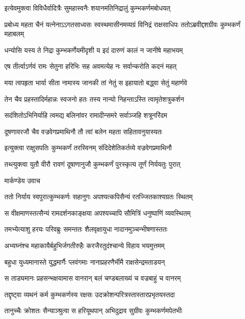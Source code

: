 \twolineshloka
{इत्येवमुक्त्वा विविधैर्वादित्रैः सुमहास्वनैः}
{शयानमतिनिद्रालुं कुम्भकर्णमबोधयत्}


\threelineshloka
{प्रबोध्य महता चैनं यत्नेनाऽऽगतसाध्वसः}
{स्वस्थमासीनमव्यग्रं विनिद्रं राक्षसाधिपः}
{ततोऽब्रवीद्दशग्रीवः कुम्भकर्णं महाबलम्}


\twolineshloka
{धन्योसि यस्य ते निद्रा कुम्भकर्णेयमीदृशी}
{य इदं दारुणं कालं न जानीषे महाभयम्}


\twolineshloka
{एष तीर्त्वाऽर्णवं रामः सेतुना हरिभिः सह}
{अवमत्येह नः सर्वान्करोति कदनं महत्}


\twolineshloka
{मया त्वपहृता भार्या सीता नामास्य जानकी}
{तां नेतुं स इहायातो बद्ध्वा सेतुं महार्णवे}


\twolineshloka
{तेन चैव प्रहस्तादिर्महान्नः स्वजनो हतः}
{तस्य नान्यो निहन्ताऽस्ति त्वामृतेशत्रुकर्शन}


\twolineshloka
{सदंशितोऽभिनिर्याहि त्वमद्य बलिनांवर}
{रामादीन्समरे सर्वाञ्जहि शत्रूनरिंदम}


\twolineshloka
{दूषणावरजौ चैव वज्रवेगप्रमाथिनौ}
{तौ त्वां बलेन महता सहितावनुयास्यतः}


\twolineshloka
{इत्युक्त्वा राक्षुसपतिः कुम्भकर्णं तरस्विनम्}
{संदिदेशेतिकर्तव्ये वज्रवेगप्रमाथिनौ}


\twolineshloka
{तथ्त्युक्त्वा युतौ वीरौ रावणं दूषाणानुजौ}
{कुम्भकर्णं पुरस्कृत्य तूर्णं निर्ययतुः पुरात्}


\twolineshloka
{मार्कण्डेय उवाच}
{}


\twolineshloka
{ततो निर्याय स्वपुरात्कुम्भकर्णः सहानुगः}
{अपश्यत्कपिसैन्यं रतज्जितकाश्यग्रतः स्थितम्}


\twolineshloka
{स वीक्षमाणस्तत्सैन्यं रामदर्शनकाङ्क्षया}
{अपश्यच्चापि सौमित्रिं धनुष्पाणिं व्यवस्थितम्}


\twolineshloka
{तमभ्येत्याशु हरयः परिवब्रुः समन्ततः}
{शैलवृक्षायुधा नादानमुञ्चन्भीषणास्ततः}


\twolineshloka
{अभ्यघ्नंश्च महाकायैर्बहुभिर्जगतीरुहैः}
{करजैरतुदंश्चान्ये विहाय भयमुत्तमम्}


\twolineshloka
{बहुधा युध्यमानास्ते युद्धमार्गैः प्लवंगमाः}
{नानाप्रहरणैर्भीमै राक्षसेन्द्रमताडयन्}


\twolineshloka
{स ताड्यमानः प्रहसन्भक्षयामास वानरान्}
{बलं चण्डबलाख्यं च वज्रबाहुं च वानरम्}


\twolineshloka
{तद्दृष्ट्वा व्यथनं कर्म कुम्भकर्णस्य रक्षसः}
{उदक्रोशन्परित्रस्तास्तारप्रभृतयस्तदा}


\twolineshloka
{तानुच्चैः क्रोशतः सैन्याञ्श्रुत्वा स हरियूथपान्}
{अभिदुद्राव सुग्रीवः कुम्भकर्णमपेतभीः}


